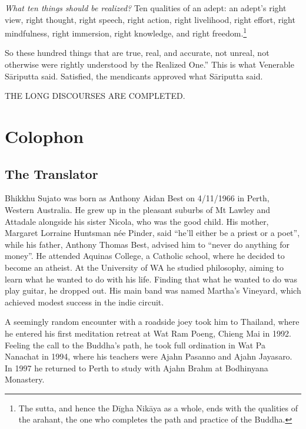 \documentclass[12pt,openany]{book}%
\newcommand*{\scendbook}[1]{\bigskip\begin{Center}\uppercase{#1}\end{Center}\addvspace{1em}}
\let\oldbackmatter\backmatter
\renewcommand{\backmatter}{%
\chapterfont{\setstretch{.85}\normalfont\centering}%
\sectionfont{\setstretch{.85}\normalfont\BalancedRagged}%
\pagestyle{plainer}%
\oldbackmatter}
\begin{document}
\emph{What ten things should be realized?} Ten qualities of an adept: an adept’s right view, right thought, right speech, right action, right livelihood, right effort, right mindfulness, right immersion, right knowledge, and right freedom.\footnote{The sutta, and hence the \textsanskrit{Dīgha} \textsanskrit{Nikāya} as a whole, ends with the qualities of the arahant, the one who completes the path and practice of the Buddha. } 

So these hundred things that are true, real, and accurate, not unreal, not otherwise were rightly understood by the Realized One.” This is what Venerable \textsanskrit{Sāriputta} said. Satisfied, the mendicants approved what \textsanskrit{Sāriputta} said. 

\scendbook{The Long Discourses are completed. }

%
\backmatter%
%
\chapter*{Colophon}

\section*{The Translator}

Bhikkhu Sujato was born as Anthony Aidan Best on 4/11/1966 in Perth, Western Australia. He grew up in the pleasant suburbs of Mt Lawley and Attadale alongside his sister Nicola, who was the good child. His mother, Margaret Lorraine Huntsman née Pinder, said “he’ll either be a priest or a poet”, while his father, Anthony Thomas Best, advised him to “never do anything for money”. He attended Aquinas College, a Catholic school, where he decided to become an atheist. At the University of WA he studied philosophy, aiming to learn what he wanted to do with his life. Finding that what he wanted to do was play guitar, he dropped out. His main band was named Martha’s Vineyard, which achieved modest success in the indie circuit. 

A seemingly random encounter with a roadside joey took him to Thailand, where he entered his first meditation retreat at Wat Ram Poeng, Chieng Mai in 1992. Feeling the call to the Buddha’s path, he took full ordination in Wat Pa Nanachat in 1994, where his teachers were Ajahn Pasanno and Ajahn Jayasaro. In 1997 he returned to Perth to study with Ajahn Brahm at Bodhinyana Monastery. 
\end{document}
